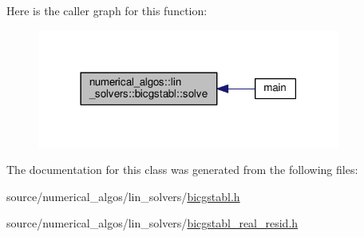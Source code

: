 Here is the caller graph for this function\-:\nopagebreak
\begin{figure}[H]
\begin{center}
\leavevmode
\includegraphics[width=282pt]{classnumerical__algos_1_1lin__solvers_1_1bicgstabl_a2dd4f6cdd207b1a77aa94831fbdf9839_icgraph}
\end{center}
\end{figure}




The documentation for this class was generated from the following files\-:\begin{DoxyCompactItemize}
\item 
source/numerical\-\_\-algos/lin\-\_\-solvers/\hyperlink{bicgstabl_8h}{bicgstabl.\-h}\item 
source/numerical\-\_\-algos/lin\-\_\-solvers/\hyperlink{bicgstabl__real__resid_8h}{bicgstabl\-\_\-real\-\_\-resid.\-h}\end{DoxyCompactItemize}

